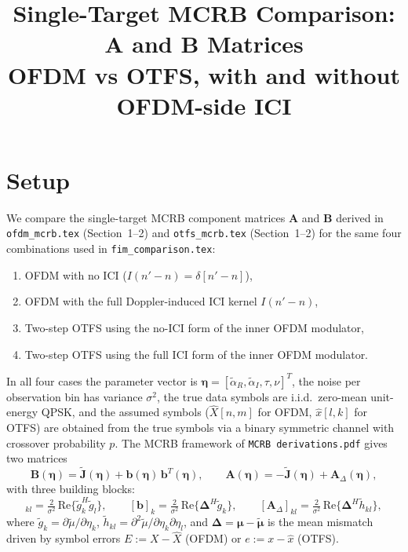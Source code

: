\documentclass[11pt]{article}
\title{Single-Target MCRB Comparison: \texorpdfstring{\(\bm{A}\) and \(\bm{B}\)}{A and B} Matrices\\
OFDM vs OTFS, with and without OFDM-side ICI}
\author{}
\date{}
\begin{document}
\maketitle

\section{Setup}

We compare the single-target MCRB component matrices \(\bm{A}\) and \(\bm{B}\) derived in
\texttt{ofdm\_mcrb.tex} (Section~1--2) and \texttt{otfs\_mcrb.tex} (Section~1--2) for the
same four combinations used in \texttt{fim\_comparison.tex}:
\begin{enumerate}
    \item OFDM with no ICI (\(I(n'-n) = \delta[n'-n]\)),
    \item OFDM with the full Doppler-induced ICI kernel \(I(n'-n)\),
    \item Two-step OTFS using the no-ICI form of the inner OFDM modulator,
    \item Two-step OTFS using the full ICI form of the inner OFDM modulator.
\end{enumerate}
In all four cases the parameter vector is \(\bm{\eta} = [\tilde{\alpha}_R, \tilde{\alpha}_I, \tau, \nu]^T\), the noise per observation bin has variance \(\sigma^2\), the true data symbols are i.i.d.\ zero-mean unit-energy QPSK, and the assumed symbols (\(\hat{X}[n,m]\) for OFDM, \(\hat{x}[l,k]\) for OTFS) are obtained from the true symbols via a binary symmetric channel with crossover probability \(p\). The MCRB framework of \texttt{MCRB derivations.pdf} gives two matrices
\begin{equation}
    \boxed{\;\bm{B}(\bm{\eta}) = \tilde{\bm{J}}(\bm{\eta}) + \bm{b}(\bm{\eta})\, \bm{b}^T(\bm{\eta}), \qquad \bm{A}(\bm{\eta}) = -\tilde{\bm{J}}(\bm{\eta}) + \bm{A}_\Delta(\bm{\eta}),\;}
\end{equation}
with three building blocks:
\begin{equation}
    [\tilde{\bm{J}}]_{kl} = \tfrac{2}{\sigma^2}\, \mathrm{Re}\{\tilde{g}_k^H \tilde{g}_l\}, \qquad
    [\bm{b}]_k = \tfrac{2}{\sigma^2}\, \mathrm{Re}\{\bm{\Delta}^H \tilde{g}_k\}, \qquad
    [\bm{A}_\Delta]_{kl} = \tfrac{2}{\sigma^2}\, \mathrm{Re}\{\bm{\Delta}^H \tilde{h}_{kl}\},
\end{equation}
where \(\tilde{g}_k = \partial \tilde{\mu}/\partial \eta_k\), \(\tilde{h}_{kl} = \partial^2 \tilde{\mu}/\partial \eta_k \partial \eta_l\), and \(\bm{\Delta} = \bm{\mu} - \tilde{\bm{\mu}}\) is the mean mismatch driven by symbol errors \(E := X - \hat{X}\) (OFDM) or \(e := x - \hat{x}\) (OTFS).
\end{document}
